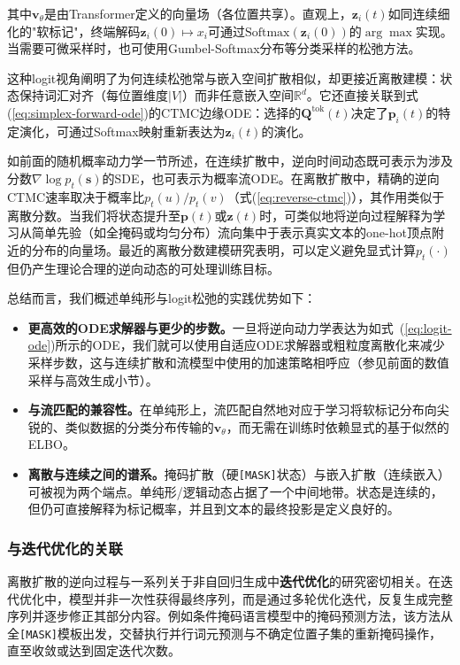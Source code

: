 \documentclass[UTF8,a4paper,zihao=-4,oneside,openany]{ctexbook}
\begin{document}
\noindent 其中$\mathbf{v}_{\theta}$是由Transformer定义的向量场（各位置共享）。直观上，$\mathbf{z}_i(t)$如同连续细化的"软标记"，终端解码$\mathbf{z}_i(0)\mapsto x_i$可通过$\mathrm{Softmax}(\mathbf{z}_i(0))$的$\arg\max$实现。当需要可微采样时，也可使用Gumbel-Softmax分布等分类采样的松弛方法\citep{jang-etal:2017categorical,maddison-etal:2017the}。

这种logit视角阐明了为何连续松弛常与嵌入空间扩散相似，却更接近离散建模：状态保持词汇对齐（每位置维度$|V|$）而非任意嵌入空间$\mathbb{R}^d$。它还直接关联到式(\ref{eq:simplex-forward-ode})的CTMC边缘ODE：选择的$\mathbf{Q}^{\mathrm{tok}}(t)$决定了$\mathbf{p}_i(t)$的特定演化，可通过Softmax映射重新表达为$\mathbf{z}_i(t)$的演化。

如前面的随机概率动力学一节所述，在连续扩散中，逆向时间动态既可表示为涉及分数$\nabla \log p_t(\mathbf{s})$的SDE，也可表示为概率流ODE。在离散扩散中，精确的逆向CTMC速率取决于概率比$p_t(u)/p_t(v)$（式(\ref{eq:reverse-ctmc})），其作用类似于离散分数。当我们将状态提升至$\mathbf{p}(t)$或$\mathbf{z}(t)$时，可类似地将逆向过程解释为学习从简单先验（如全掩码或均匀分布）流向集中于表示真实文本的one-hot顶点附近的分布的向量场。最近的离散分数建模研究表明，可以定义避免显式计算$p_t(\cdot)$但仍产生理论合理的逆向动态的可处理训练目标\citep{hoogeboom-etal:2021argmax,lou-etal:2024discrete}。

总结而言，我们概述单纯形与logit松弛的实践优势如下：
\begin{itemize}
\item \textbf{更高效的ODE求解器与更少的步数。}一旦将逆向动力学表达为如式~(\ref{eq:logit-ode})所示的ODE，我们就可以使用自适应ODE求解器或粗粒度离散化来减少采样步数，这与连续扩散和流模型中使用的加速策略相呼应（参见前面的数值采样与高效生成小节）。
\item \textbf{与流匹配的兼容性。}在单纯形上，流匹配自然地对应于学习将软标记分布向尖锐的、类似数据的分类分布传输的$\mathbf{v}_\theta$，而无需在训练时依赖显式的基于似然的ELBO。
\item \textbf{离散与连续之间的谱系。}掩码扩散（硬\texttt{[MASK]}状态）与嵌入扩散（连续嵌入）可被视为两个端点。单纯形/逻辑动态占据了一个中间地带。状态是连续的，但仍可直接解释为标记概率，并且到文本的最终投影是定义良好的。
\end{itemize}
\subsubsection{与迭代优化的关联}

离散扩散的逆向过程与一系列关于非自回归生成中\textbf{迭代优化}的研究密切相关\citep{lee-etal:2018deterministic}。在迭代优化中，模型并非一次性获得最终序列，而是通过多轮优化迭代，反复生成完整序列并逐步修正其部分内容。例如条件掩码语言模型中的掩码预测方法，该方法从全\texttt{[MASK]}模板出发，交替执行并行词元预测与不确定位置子集的重新掩码操作，直至收敛或达到固定迭代次数\citep{ghazvininejad-etal:2019mask}。
\end{document}
